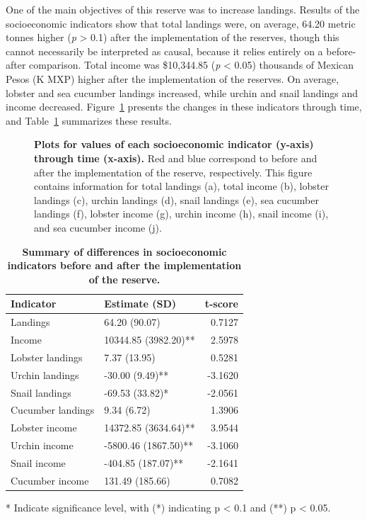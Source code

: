 \documentclass[10pt,letterpaper]{article}
\begin{document}
One of the main objectives of this reserve was to increase landings. Results of the socioeconomic indicators show that total landings were, on average, 64.20 metric tonnes higher (\emph{p} \textgreater{} 0.1) after the implementation of the reserves, though this cannot necessarily be interpreted as causal, because it relies entirely on a before-after comparison. Total income was \$10,344.85 (\emph{p} \textless{} 0.05) thousands of Mexican Pesos (K MXP) higher after the implementation of the reserves. On average, lobster and sea cucumber landings increased, while urchin and snail landings and income decreased. Figure~\ref{fig6} presents the changes in these indicators through time, and Table~\ref{table4} summarizes these results.

\begin{figure}[!h]
\caption{{\bf Plots for values of each socioeconomic indicator (y-axis) through time (x-axis).}
Red and blue correspond to before and after the implementation of the reserve, respectively. This figure contains information for total landings (a), total income (b), lobster landings (c), urchin landings (d), snail landings (e), sea cucumber landings (f), lobster income (g), urchin income (h), snail income (i), and sea cucumber income (j).}
\label{fig6}
\end{figure}

\begin{table}[!ht]
\centering
\caption{
{\bf Summary of differences in socioeconomic indicators before and after the implementation of the reserve.}}
\begin{tabular}{l|l|r}
\hline
\bfseries{Indicator} & \bfseries{Estimate (SD)} & \bfseries{t-score}\\
\hline
Landings & 64.20 (90.07) & 0.7127\\
\hline
Income & 10344.85 (3982.20)** & 2.5978\\
\hline
Lobster landings & 7.37 (13.95) & 0.5281\\
\hline
Urchin landings & -30.00 (9.49)** & -3.1620\\
\hline
Snail landings & -69.53 (33.82)* & -2.0561\\
\hline
Cucumber landings & 9.34 (6.72) & 1.3906\\
\hline
Lobster income & 14372.85 (3634.64)** & 3.9544\\
\hline
Urchin income & -5800.46 (1867.50)** & -3.1060\\
\hline
Snail income & -404.85 (187.07)** & -2.1641\\
\hline
Cucumber income & 131.49 (185.66) & 0.7082\\
\hline
\end{tabular}
\begin{flushleft} * Indicate significance level, with (*) indicating p \textless{} 0.1 and (**) p \textless{} 0.05.
\end{flushleft}
\label{table4}
\end{table}
\end{document}
